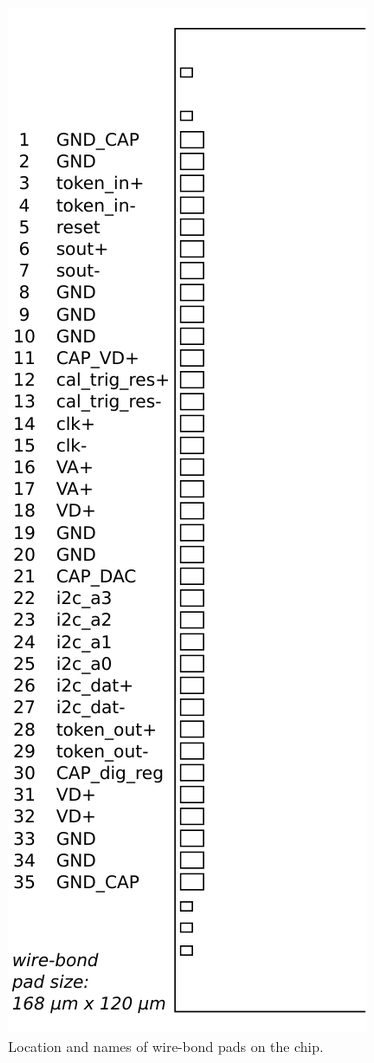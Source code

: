 \begin{figure}[hbtp]
	\begin{center}
	\includegraphics[width=.3\textwidth]{img/ROC_padschema.pdf}
	\end{center}
	\caption{Location and names of wire-bond pads on the chip.}
	\label{fig:ROCpadschematic}
\end{figure}


